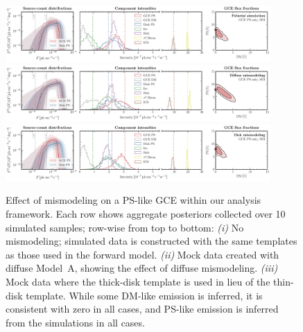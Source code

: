 \documentclass[prd,aps,10pt,nofootinbib,twocolumn,superscriptaddress,preprintnumbers,balancelastpage,longbibliography,floatfix]{revtex4-2}
\begin{document}
%
\begin{figure}[!htbp]
\centering
\includegraphics[width=0.9\textwidth]{plots/sim_sbi_ps_agg.pdf}
\includegraphics[width=0.9\textwidth]{plots/sim_sbi_modelA_ps.pdf}
\includegraphics[width=0.9\textwidth]{plots/sim_sbi_thick_disk_mm_ps.pdf}
\caption{Effect of mismodeling on a PS-like GCE within our analysis framework. Each row shows aggregate posteriors collected over 10 simulated samples; row-wise from top to bottom: \emph{(i)} No mismodeling; simulated data is constructed with the same templates as those used in the forward model. \emph{(ii)} Mock data created with diffuse {Model~A}, showing the effect of diffuse mismodeling. \emph{(iii)} Mock data where the thick-disk template is used in lieu of the thin-disk template. While some DM-like emission is inferred, it is consistent with zero in all cases, and PS-like emission is inferred from the simulations in all cases.}
\label{fig:sim_sbi_mismo_ps}
\end{figure}
%
\end{document}
